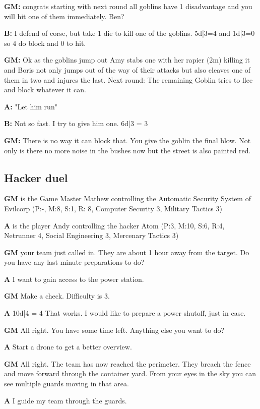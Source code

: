 \documentclass[11pt]{article}
\begin{document}
{\begin{multicols}{2}[]
\textbf{GM:} congrats starting with next round all goblins have 1 disadvantage and you will hit one of them immediately. Ben?

\textbf{B:} I defend of corse, but take 1 die to kill one of the goblins. 5d|3=4 and 1d|3=0 so 4 do block and 0 to hit.

\textbf{GM:} Ok as the goblins jump out Amy stabs one with her rapier (2m) killing it and Boris not only jumps out of the way of their attacks but also cleaves one of them in two and injures the last. Next round: The remaining Goblin tries to flee and block whatever it can.

\textbf{A:} "Let him run"

\textbf{B:} Not so fast. I try to give him one. 6d|3 = 3

\textbf{GM:} There is no way it can block that. You give the goblin the final blow. Not only is there no more noise in the bushes now but the street is also painted red.

\subsection{Hacker duel}
\label{sec:orgcd180f4}

\textbf{GM} is the Game Master Mathew controlling the Automatic Security System of Evilcorp (P:-, M:8, S:1, R: 8, Computer Security 3, Military Tactics 3)

\textbf{A} is the player Andy controlling the hacker Atom (P:3, M:10, S:6, R:4, Netrunner 4, Social Engineering 3, Mercenary Tactics 3)

\textbf{GM} your team just called in. They are about 1 hour away from the target. Do you have any last minute preparations to do?

\textbf{A} I want to gain access to the power station.

\textbf{GM} Make a check. Difficulty is 3.

\textbf{A} 10d|4 = 4 That works. I would like to prepare a power shutoff, just in case.

\textbf{GM} All right. You have some time left. Anything else you want to do?

\textbf{A} Start a drone to get a better overview.

\textbf{GM} All right. The team has now reached the perimeter. They breach the fence and move forward through the container yard. From your eyes in the sky you can see multiple guards moving in that area.

\textbf{A} I guide my team through the guards.


\end{multicols}}
\end{document}

